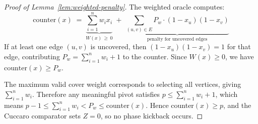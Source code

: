 \documentclass{ieeeaccess}
\newenvironment{prf}{\begin{proof}}{\end{proof}}
\begin{document}
\begin{prf}[Proof of Lemma~\ref{lem:weighted-penalty}]
The weighted oracle computes:
\begin{equation}
    \mathrm{counter}(x)
    \;=\;
    \underbrace{\sum_{i=1}^{n} w_i x_i}_{W(x)\,\geq\,0}
    \;+\;
    \underbrace{
        \sum_{(u,v)\in E}
        P_w \cdot (1-x_u)(1-x_v)
    }_{\text{penalty for uncovered edges}}
    \label{eq:weighted-counter}
\end{equation}
If at least one edge $(u,v)$ is uncovered, then
$(1-x_u)(1-x_v) = 1$ for that edge, contributing
$P_w = \sum_{i=1}^{n} w_i + 1$ to the counter. Since
$W(x) \geq 0$, we have $\mathrm{counter}(x) \geq P_w$.

The maximum valid cover weight corresponds to selecting all
vertices, giving $\sum_{i=1}^{n} w_i$. Therefore any
meaningful pivot satisfies $p \leq \sum_{i=1}^{n} w_i + 1$,
which means $p - 1 \leq \sum_{i=1}^n w_i < P_w \leq
\mathrm{counter}(x)$. Hence counter$(x) \geq p$, and the
Cuccaro comparator sets $Z = 0$, so no phase kickback occurs.
\end{prf}
\end{document}

